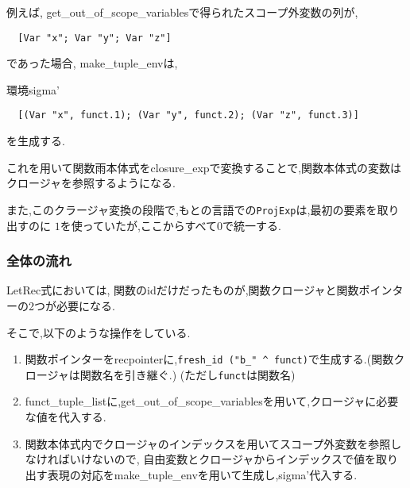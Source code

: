 例えば, get\_out\_of\_scope\_variablesで得られたスコープ外変数の列が,

\begin{lstlisting}
  [Var "x"; Var "y"; Var "z"]
\end{lstlisting}

であった場合, make\_tuple\_envは,

環境sigma'

\begin{lstlisting}
  [(Var "x", funct.1); (Var "y", funct.2); (Var "z", funct.3)]
\end{lstlisting}

を生成する.

これを用いて関数雨本体式をclosure\_expで変換することで,関数本体式の変数はクロージャを参照するようになる.

また,このクラージャ変換の段階で,もとの言語での\lstinline{ProjExp}は,最初の要素を取り出すのに $1$を使っていたが,ここからすべて$0$で統一する.

\subsubsection*{全体の流れ}

LetRec式においては, 関数のidだけだったものが,関数クロージャと関数ポインターの2つが必要になる. 

そこで,以下のような操作をしている.

\begin{enumerate}
\item 関数ポインターをrecpointerに,\lstinline{fresh_id ("b_" ^ funct)}で生成する.(関数クロージャは関数名を引き継ぐ.) (ただし\lstinline{funct}は関数名)

\item funct\_tuple\_listに,get\_out\_of\_scope\_variablesを用いて,クロージャに必要な値を代入する.
\item 関数本体式内でクロージャのインデックスを用いてスコープ外変数を参照しなければいけないので, 自由変数とクロージャからインデックスで値を取り出す表現の対応をmake\_tuple\_envを用いて生成し,sigma'代入する.
\end{enumerate}

